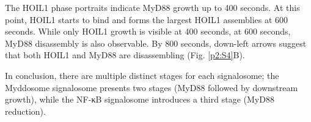 The HOIL1 phase portraits indicate MyD88 growth up to 400 seconds. At this point, HOIL1 starts to bind and forms the largest HOIL1 assemblies at 600 seconds. While only HOIL1 growth is visible at 400 seconds, at 600 seconds, MyD88 disassembly is also observable. By 800 seconds, down-left arrows suggest that both HOIL1 and MyD88 are disassembling (Fig. \ref{p2:S4}B).

In conclusion, there are multiple distinct stages for each signalosome; the Myddosome signalosome presents two stages (MyD88 followed by downstream growth), while the NF-κB signalosome introduces a third stage (MyD88 reduction).


\begin{centering}


\end{centering}
